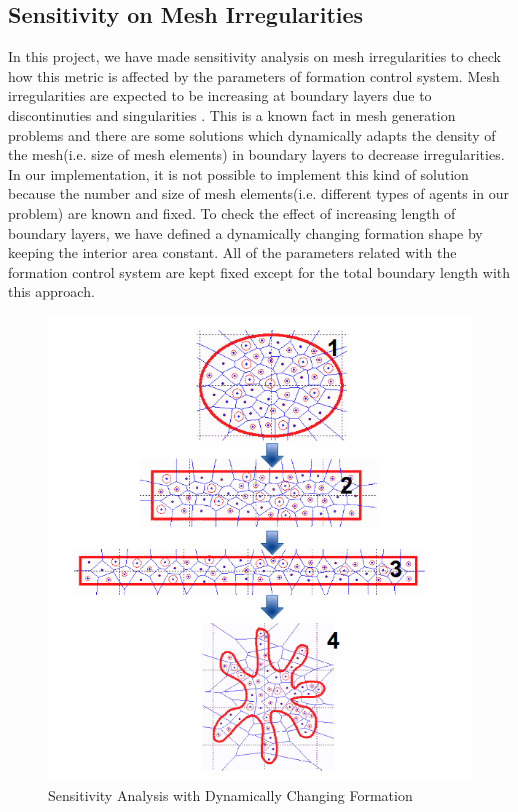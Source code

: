 \subsection{Sensitivity on Mesh Irregularities} \label{sensitiviy_ref}
In this project, we have made sensitivity analysis on mesh irregularities to check how this metric is affected by the parameters of formation control system. Mesh irregularities are expected to be increasing at boundary layers due to discontinuties and singularities \cite{sensitivity}. This is a known fact in mesh generation problems and there are some solutions which dynamically adapts the density of the mesh(i.e. size of mesh elements) in boundary layers to decrease irregularities.  In our implementation, it is not possible to implement this kind of solution because the number and size of mesh elements(i.e. different types of agents in our problem) are known and fixed. To check the effect of increasing length of boundary layers, we have defined a dynamically changing formation shape by keeping the interior area constant. All of the parameters related with the formation control system are kept fixed except for the total boundary length with this approach.

\begin{figure}[H]
\caption{Sensitivity Analysis with Dynamically Changing Formation} \label{sens_ref}
\centerline{\includegraphics[scale = 0.50]{sensitivity}}
\end{figure} 
  
